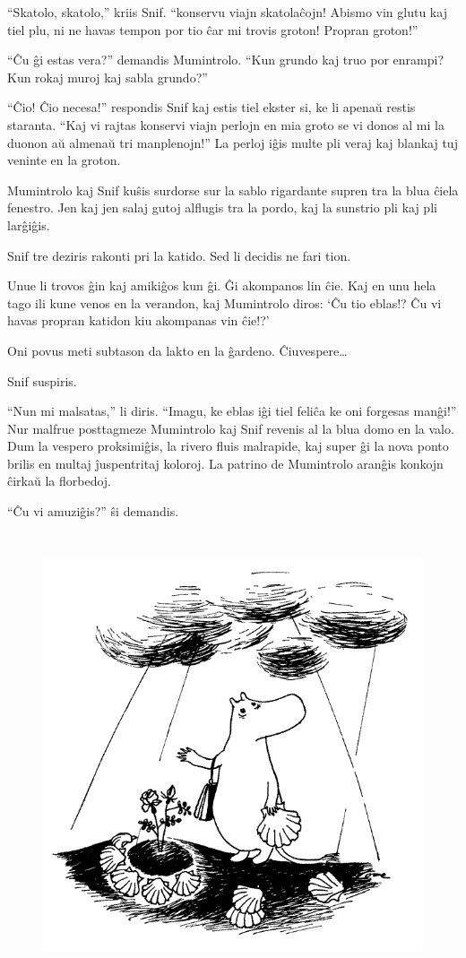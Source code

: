 ``Skatolo, skatolo,'' kriis Snif. ``konservu viajn skatolaĉojn! Abismo vin glutu kaj tiel plu, ni ne havas tempon por tio ĉar mi trovis groton! Propran groton!''

``Ĉu ĝi estas vera?'' demandis Mumintrolo. ``Kun grundo kaj truo por enrampi? Kun rokaj muroj kaj sabla grundo?''

``Ĉio! Ĉio necesa!'' respondis Snif kaj estis tiel ekster si, ke li apenaŭ restis staranta. ``Kaj vi rajtas konservi viajn perlojn en mia groto se vi donos al mi la duonon aŭ almenaŭ tri manplenojn!''
\sectionbreak
La perloj iĝis multe pli veraj kaj blankaj tuj veninte en la groton.

Mumintrolo kaj Snif kuŝis surdorse sur la sablo rigardante supren tra la blua ĉiela fenestro. Jen kaj jen salaj gutoj alflugis tra la pordo, kaj la sunstrio pli kaj pli larĝiĝis.

Snif tre deziris rakonti pri la katido. Sed li decidis ne fari tion.

Unue li trovos ĝin kaj amikiĝos kun ĝi. Ĝi akompanos lin ĉie. Kaj en unu hela tago ili kune venos en la verandon, kaj Mumintrolo diros: `Ĉu tio eblas!? Ĉu vi havas propran katidon kiu akompanas vin ĉie!?'

Oni povus meti subtason da lakto en la ĝardeno. Ĉiuvespere{\ldots}

Snif suspiris.

``Nun mi malsatas,'' li diris. ``Imagu, ke eblas iĝi tiel feliĉa ke oni forgesas manĝi!''
\sectionbreak
Nur malfrue posttagmeze Mumintrolo kaj Snif revenis al la blua domo en la valo. Dum la vespero proksimiĝis, la rivero fluis malrapide, kaj super ĝi la nova ponto brilis en multaj ĵuspentritaj koloroj. La patrino de Mumintrolo aranĝis konkojn ĉirkaŭ la florbedoj.

``Ĉu vi amuziĝis?'' ŝi demandis.

\begin{figure}[htbp]
\centering
\includegraphics[width=359pt,height=371pt]{1-9.png}
\caption{}
\label{1-9}
\end{figure}

